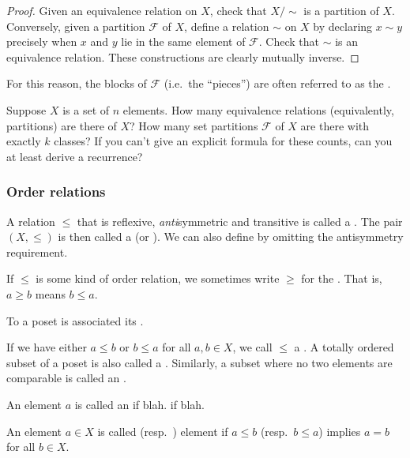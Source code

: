 \begin{proof}
Given an equivalence relation on $X$, check that $X/{\sim}$ is a partition of $X$. Conversely, given a partition $\mathcal{F}$ of $X$, define a relation $\sim$ on $X$ by declaring $x \sim y$ precisely when $x$ and $y$ lie in the same element of $\mathcal{F}$. Check that $\sim$ is an equivalence relation. These constructions are clearly mutually inverse.
\end{proof}

For this reason, the blocks of $\mathcal{F}$ (i.e.\ the ``pieces'') are often referred to as the .

\begin{exercise}
Suppose $X$ is a set of $n$ elements. How many equivalence relations (equivalently, partitions) are there of $X$? How many set partitions $\mathcal{F}$ of $X$ are there with exactly $k$ classes? If you can't give an explicit formula for these counts, can you at least derive a recurrence?
\end{exercise}

\subsubsection{Order relations}

\begin{definition}
A relation $\leq$ that is reflexive, \emph{anti}symmetric and transitive is called a . The pair $(X,\leq)$ is then called a  (or ). We can also define  by omitting the antisymmetry requirement.
\end{definition}

If $\leq$ is some kind of order relation, we sometimes write $\geq$ for the . That is, $a \geq b$ means $b \leq a$.

To a poset is associated its . %

If we have either $a \leq b$ or $b \leq a$ for all $a,b \in X$, we call $\leq$ a . A totally ordered subset of a poset is also called a . Similarly, a subset where no two elements are comparable is called an .

An element $a$ is called an  if blah.  if blah.

An element $a \in X$ is called  (resp.\ ) element if $a \leq b$ (resp.\ $b \leq a$) implies $a=b$ for all $b \in X$.

